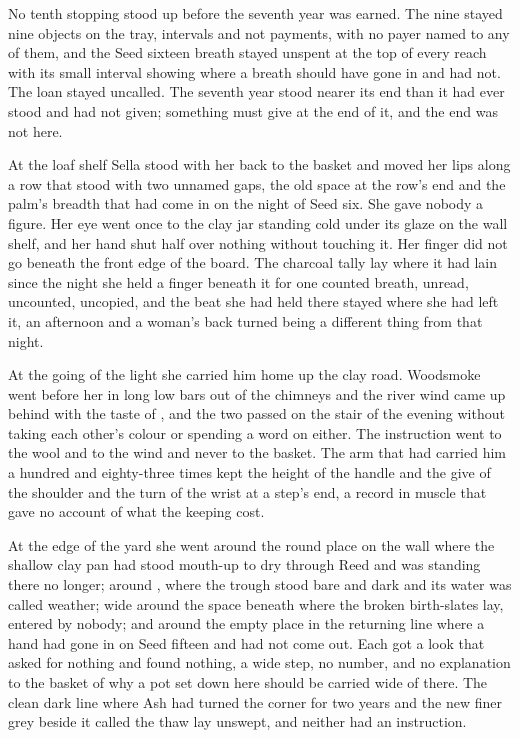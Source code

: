 No tenth stopping stood up before the seventh year was earned. The nine stayed nine objects on the tray, intervals and not payments, with no payer named to any of them, and the Seed sixteen breath stayed unspent at the top of every reach with its small interval showing where a breath should have gone in and had not. The loan stayed uncalled. The seventh year stood nearer its end than it had ever stood and had not given; something must give at the end of it, and the end was not here.

At the loaf shelf Sella stood with her back to the basket and moved her lips along a row that stood with two unnamed gaps, the old space at the row's end and the palm's breadth that had come in on the night of Seed six. She gave nobody a figure. Her eye went once to the clay jar standing cold under its glaze on the wall shelf, and her hand shut half over nothing without touching it. Her finger did not go beneath the front edge of the board. The charcoal tally lay where it had lain since the night she held a finger beneath it for one counted breath, unread, uncounted, uncopied, and the beat she had held there stayed where she had left it, an afternoon and a woman's back turned being a different thing from that night.

\scenebreak

At the going of the light she carried him home up the clay road. Woodsmoke went before her in long low bars out of the chimneys and the river wind came up behind with the taste of , and the two passed on the stair of the evening without taking each other's colour or spending a word on either. The instruction went to the wool and to the wind and never to the basket. The arm that had carried him a hundred and eighty-three times kept the height of the handle and the give of the shoulder and the turn of the wrist at a step's end, a record in muscle that gave no account of what the keeping cost.

At the edge of the yard she went around the round place on the wall where the shallow clay pan had stood mouth-up to dry through Reed and was standing there no longer; around , where the trough stood bare and dark and its water was called weather; wide around the space beneath  where the broken birth-slates lay, entered by nobody; and around the empty place in the returning line where a hand had gone in on Seed fifteen and had not come out. Each got a look that asked for nothing and found nothing, a wide step, no number, and no explanation to the basket of why a pot set down here should be carried wide of there. The clean dark line where Ash had turned the corner for two years and the new finer grey beside it called the thaw lay unswept, and neither had an instruction.

